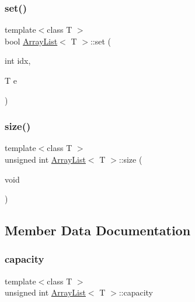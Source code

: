 \mbox{\label{class_array_list_ad1cb8be40adb8473fb90e8d03f6316d9}} 
\subsubsection{\texorpdfstring{set()}{set()}}
{\footnotesize\ttfamily template$<$class T $>$ \\
bool \hyperlink{class_array_list}{Array\+List}$<$ T $>$\+::set (\begin{DoxyParamCaption}\item[{int}]{idx,  }\item[{T}]{e }\end{DoxyParamCaption})}

\mbox{\label{class_array_list_a0022a453da89f2e5de3e6a50e5b40991}} 
\subsubsection{\texorpdfstring{size()}{size()}}
{\footnotesize\ttfamily template$<$class T $>$ \\
unsigned int \hyperlink{class_array_list}{Array\+List}$<$ T $>$\+::size (\begin{DoxyParamCaption}\item[{void}]{ }\end{DoxyParamCaption})}



\subsection{Member Data Documentation}
\mbox{\label{class_array_list_a00ce7409fee400cc2b756714297e4085}} 
\subsubsection{\texorpdfstring{capacity}{capacity}}
{\footnotesize\ttfamily template$<$class T $>$ \\
unsigned int \hyperlink{class_array_list}{Array\+List}$<$ T $>$\+::capacity\hspace{0.3cm}{\ttfamily [private]}}


